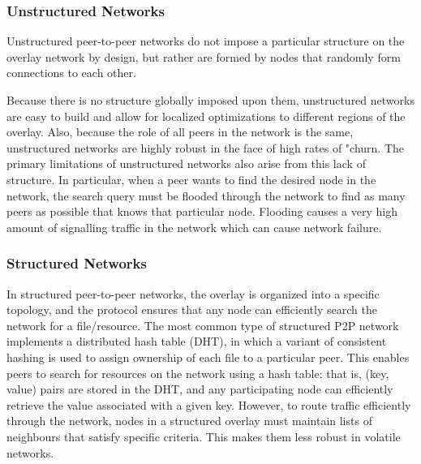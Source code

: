 \subsubsection{Unstructured Networks}
\vspace{12pt}
Unstructured peer-to-peer networks do not impose a particular structure on the overlay network by design, but rather are formed by nodes that randomly form connections to each other.

\vspace{12pt}
Because there is no structure globally imposed upon them, unstructured networks are easy to build and allow for localized optimizations to different regions of the overlay. Also, because the role of all peers in the network is the same, unstructured networks are highly robust in the face of high rates of "churn.
\vspace{12pt}
The primary limitations of unstructured networks also arise from this lack of structure. In particular, when a peer wants to find the desired node in the network, the search query must be flooded through the network to find as many peers as possible that knows that particular node. Flooding causes a very high amount of signalling traffic in the network which can cause network failure.

\vspace{12pt}
\subsubsection{Structured Networks}
\vspace{12pt}
In structured peer-to-peer networks, the overlay is organized into a specific topology, and the protocol ensures that any node can efficiently search the network for a file/resource.
\vspace{12pt}
The most common type of structured P2P network implements a distributed hash table (DHT), in which a variant of consistent hashing is used to assign ownership of each file to a particular peer. This enables peers to search for resources on the network using a hash table: that is, (key, value) pairs are stored in the DHT, and any participating node can efficiently retrieve the value associated with a given key.
\vspace{12pt}
However, to route traffic efficiently through the network, nodes in a structured overlay must maintain lists of neighbours that satisfy specific criteria. This makes them less robust in volatile networks. 

\vspace{12pt}
